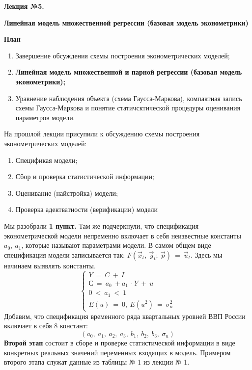 \documentclass[12pt,a4paper]{article}
\author{Аверьянов Тимофей, Корякин Алексей}
\begin{document}
\begin{center}
\textbf{Лекция №5. }

\textbf{Линейная модель множественной регрессии (базовая модель эконометрики)}

\textbf{План}
\end{center}

\begin{enumerate}
\item Завершение обсуждения схемы построения эконометрических моделей;
\item \textbf{Линейная модель множественной и парной регрессии (базовая модель эконометрики);}
\item Уравнение наблюдения объекта (схема Гаусса-Маркова), компактная запись схемы Гаусса-Маркова и понятие статичсктической процедуры оценивания параметров модели.
\end{enumerate}

На прошлой лекции присупили к обсуждению схемы построения эконометрических моделей:
\begin{enumerate}
\item Спецификая модели;
\item Сбор и проверка статистической информации;
\item Оценивание (найстройка) модели;
\item Проверка адектватности (верификации) модели
\end{enumerate}

	Мы разобрали \textbf{1 пункт. }Там же подчеркнули, что спецификация эконометрической модели непременно включает в себя неизвестные константы $\displaystyle a_{0} ,\ a_{1}$, которые называют параметрами модели. В самом общем виде спецификация модели записывается так: $\displaystyle F\left(\vec{x}_{t} ,\ \vec{y}_{t} ;\ \vec{p}\right) \ =\ \vec{u}_{t}$. Здесь мы начинаем выявлять константы.
\begin{equation*}
\begin{cases}
Y\ =\ C\ +\ I\\
С\ =\ a_{0} \ +a_{1} \ \cdot Y\ +\ u\\
0\ < \ a_{1} \ < \ 1\\
E( u) \ =\ 0,\ E\left( u^{2}\right) \ =\ \sigma ^{2}_{u}
\end{cases}
\end{equation*}
Добавим, что спецификация временного ряда квартальных уровней ВВП России включает в себя 8 констант:
\begin{equation*}
( a_{0} ,\ a_{1} ,\ a_{2} ,\ a_{3} ,\ b_{1} ,\ b_{2} ,\ b_{3} ,\ \sigma _{u})
\end{equation*}
\textbf{	Второй этап} состоит в сборе и проверке статистической информации в виде конкретных реальных значений переменных входящих в модель. Примером второго этапа служат данные из таблицы № 1 из лекции № 1.
\end{document}
